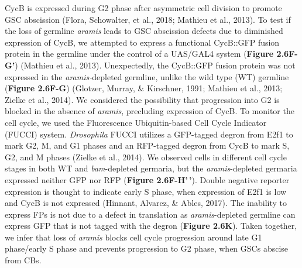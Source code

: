 \documentclass[12pt,oneside]{reedthesis}
\begin{document}
CycB is expressed during G2 phase after asymmetric cell division to promote GSC abscission (Flora, Schowalter, et al., 2018; Mathieu et al., 2013). To test if the loss of germline \emph{aramis} leads to GSC abscission defects due to diminished expression of CycB, we attempted to express a functional CycB::GFP fusion protein in the germline under the control of a UAS/GAL4 system (\textbf{Figure 2.6F-G'}) (Mathieu et al., 2013). Unexpectedly, the CycB::GFP fusion protein was not expressed in the \emph{aramis-}depleted germline, unlike the wild type (WT) germline (\textbf{Figure 2.6F-G}) (Glotzer, Murray, \& Kirschner, 1991; Mathieu et al., 2013; Zielke et al., 2014). We considered the possibility that progression into G2 is blocked in the absence of \emph{aramis}, precluding expression of CycB. To monitor the cell cycle, we used the Fluorescence Ubiquitin-based Cell Cycle Indicator (FUCCI) system. \emph{Drosophila} FUCCI utilizes a GFP-tagged degron from E2f1 to mark G2, M, and G1 phases and an RFP-tagged degron from CycB to mark S, G2, and M phases (Zielke et al., 2014). We observed cells in different cell cycle stages in both WT and \emph{bam}-depleted germaria, but the \emph{aramis}-depleted germaria expressed neither GFP nor RFP (\textbf{Figure 2.6F-H'\,'}). Double negative reporter expression is thought to indicate early S phase, when expression of E2f1 is low and CycB is not expressed (Hinnant, Alvarez, \& Ables, 2017). The inability to express FPs is not due to a defect in translation as \emph{aramis}-depleted germline can express GFP that is not tagged with the degron (\textbf{Figure 2.6K}). Taken together, we infer that loss of \emph{aramis} blocks cell cycle progression around late G1 phase/early S phase and prevents progression to G2 phase, when GSCs abscise from CBs.
\end{document}
